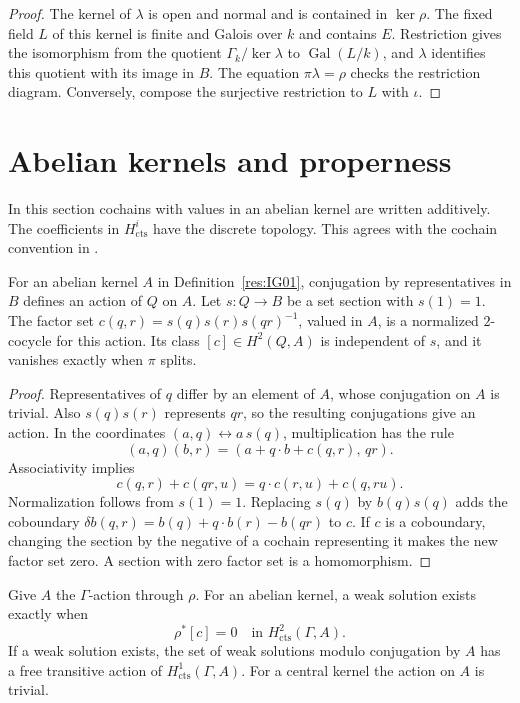 \begin{proof}
The kernel of \(\lambda\) is open and normal and is contained in
\(\ker\rho\). The fixed field \(L\) of this kernel is finite and
Galois over \(k\) and contains \(E\). Restriction gives the
isomorphism from the quotient \(\Gamma_k/\ker\lambda\) to
\(\operatorname{Gal}(L/k)\), and \(\lambda\) identifies this
quotient with its image in \(B\). The equation
\(\pi\lambda=\rho\) checks the restriction diagram. Conversely,
compose the surjective restriction to \(L\) with \(\iota\).
\end{proof}

\section{Abelian kernels and properness}

In this section cochains with values in an abelian kernel are written
additively. The coefficients in \(H^i_{\mathrm{cts}}\) have the
discrete topology. This agrees with the cochain convention in
\cite[Results GC01 and GC04--GC05]{mg-groups}.

\begin{lemma}
\label{res:IG03}
For an abelian kernel \(A\) in Definition~\ref{res:IG01}, conjugation
by representatives in \(B\) defines an action of \(Q\) on \(A\).
Let \(s\colon Q\to B\) be a set section with \(s(1)=1\).
The factor set \(c(q,r)=s(q)s(r)s(qr)^{-1}\), valued in \(A\),
is a normalized \(2\)-cocycle for this action. Its class
\([c]\in H^2(Q,A)\) is independent of \(s\), and it vanishes
exactly when \(\pi\) splits.
\end{lemma}

\begin{proof}
Representatives of \(q\) differ by an element of \(A\), whose
conjugation on \(A\) is trivial. Also \(s(q)s(r)\) represents \(qr\),
so the resulting conjugations give an action. In the coordinates
\((a,q)\leftrightarrow a\,s(q)\), multiplication has the rule
\[
 (a,q)(b,r)=(a+q\cdot b+c(q,r),\,qr).
\]
Associativity implies
\[
 c(q,r)+c(qr,u)=q\cdot c(r,u)+c(q,ru).
\]
Normalization follows from \(s(1)=1\). Replacing \(s(q)\) by
\(b(q)s(q)\) adds the coboundary
\(\delta b(q,r)=b(q)+q\cdot b(r)-b(qr)\) to \(c\).
If \(c\) is a coboundary, changing the section by the negative of a
cochain representing it makes the new factor set zero. A section
with zero factor set is a homomorphism.
\end{proof}

\begin{theorem}
\label{res:IG04}
Give \(A\) the \(\Gamma\)-action through \(\rho\).
For an abelian kernel, a weak solution exists exactly when
\[
        \rho^*[c]=0\quad\text{in }H^2_{\mathrm{cts}}(\Gamma,A).
\]
If a weak solution exists, the set of weak solutions modulo
conjugation by \(A\) has a free transitive action of
\(H^1_{\mathrm{cts}}(\Gamma,A)\).
For a central kernel the action on \(A\) is trivial.
\end{theorem}

